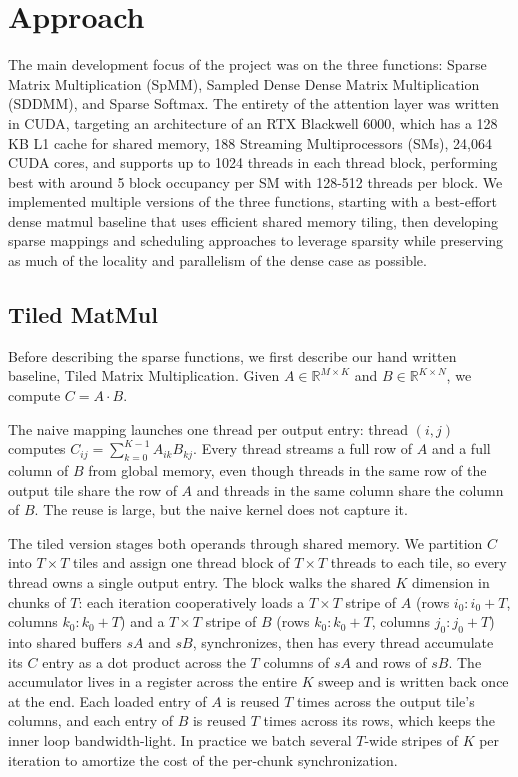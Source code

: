 \documentclass[11pt]{article}
\begin{document}
\section*{Approach}
The main development focus of the project was on the three functions: Sparse Matrix Multiplication (SpMM), Sampled Dense Dense Matrix Multiplication (SDDMM), and Sparse Softmax. The entirety of the attention layer was written in CUDA, targeting an architecture of an RTX Blackwell 6000, which has a 128 KB L1 cache for shared memory, 188 Streaming Multiprocessors (SMs), 24,064 CUDA cores, and supports up to 1024 threads in each thread block, performing best with around 5 block occupancy per SM with 128-512 threads per block. We implemented multiple versions of the three functions, starting with a best-effort dense matmul baseline that uses efficient shared memory tiling, then developing sparse mappings and scheduling approaches to leverage sparsity while preserving as much of the locality and parallelism of the dense case as possible.

\subsection*{Tiled MatMul}
Before describing the sparse functions, we first describe our hand written baseline, Tiled Matrix Multiplication. Given $A \in \mathbb{R}^{M \times K}$ and $B \in \mathbb{R}^{K \times N}$, we compute $C = A \cdot B$.

The naive mapping launches one thread per output entry: thread $(i, j)$ computes $C_{ij} = \sum_{k=0}^{K-1} A_{ik} B_{kj}$. Every thread streams a full row of $A$ and a full column of $B$ from global memory, even though threads in the same row of the output tile share the row of $A$ and threads in the same column share the column of $B$. The reuse is large, but the naive kernel does not capture it.

The tiled version stages both operands through shared memory. We partition $C$ into $T \times T$ tiles and assign one thread block of $T \times T$ threads to each tile, so every thread owns a single output entry. The block walks the shared $K$ dimension in chunks of $T$: each iteration cooperatively loads a $T \times T$ stripe of $A$ (rows $i_0{:}i_0+T$, columns $k_0{:}k_0+T$) and a $T \times T$ stripe of $B$ (rows $k_0{:}k_0+T$, columns $j_0{:}j_0+T$) into shared buffers $sA$ and $sB$, synchronizes, then has every thread accumulate its $C$ entry as a dot product across the $T$ columns of $sA$ and rows of $sB$. The accumulator lives in a register across the entire $K$ sweep and is written back once at the end. Each loaded entry of $A$ is reused $T$ times across the output tile's columns, and each entry of $B$ is reused $T$ times across its rows, which keeps the inner loop bandwidth-light. In practice we batch several $T$-wide stripes of $K$ per iteration to amortize the cost of the per-chunk synchronization.
\end{document}
